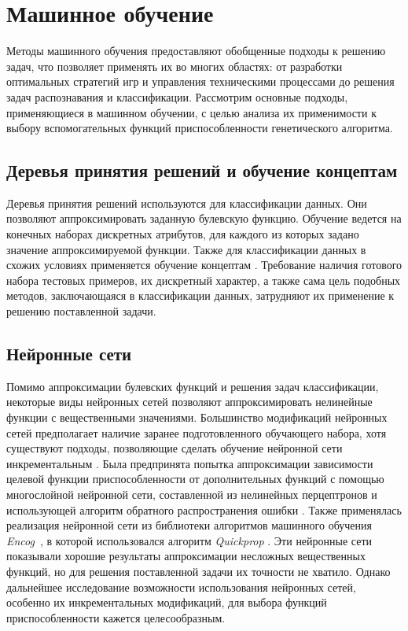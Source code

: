 \section{Машинное обучение}
\label{ml}	
	Методы машинного обучения \cite{mitchell-ml} предоставляют обобщенные подходы к решению задач, что позволяет применять их во многих областях: от разработки оптимальных стратегий игр и управления техническими процессами до решения задач распознавания и классификации. Рассмотрим основные подходы, применяющиеся в машинном обучении, с целью анализа их применимости к выбору вспомогательных функций приспособленности генетического алгоритма.
	\subsection{Деревья принятия решений и обучение концептам}
	Деревья принятия решений используются для классификации данных. Они позволяют аппроксимировать заданную булевскую функцию. Обучение ведется на конечных наборах дискретных атрибутов, для каждого из которых задано значение аппроксимируемой функции. Также для классификации данных в схожих условиях применяется обучение концептам \cite{mitchell-ml}.
	Требование наличия готового набора тестовых примеров, их дискретный характер, а также сама цель подобных методов, заключающаяся в классификации данных, затрудняют их применение к решению поставленной задачи.
	\subsection{Нейронные сети}	
	Помимо аппроксимации булевских функций и решения задач классификации, некоторые виды нейронных сетей позволяют аппроксимировать нелинейные функции с вещественными значениями. Большинство модификаций нейронных сетей предполагает наличие заранее подготовленного обучающего набора, хотя существуют подходы, позволяющие сделать обучение нейронной сети инкрементальным \cite{incremental}.
	Была предпринята попытка аппроксимации зависимости целевой функции приспособленности от дополнительных функций с помощью многослойной нейронной сети, составленной из нелинейных перцептронов и использующей алгоритм обратного распространения ошибки \cite{alpaydin, systems}. Также применялась реализация нейронной сети из библиотеки алгоритмов машинного обучения \emph{Encog}~\cite{encog}, в которой использовался алгоритм \emph{Quickprop} \cite{quickprop}. Эти нейронные сети показывали хорошие результаты аппроксимации несложных вещественных функций, но для решения поставленной задачи их точности не хватило. Однако дальнейшее исследование возможности использования нейронных сетей, особенно их инкрементальных модификаций, для выбора функций приспособленности кажется целесообразным.
